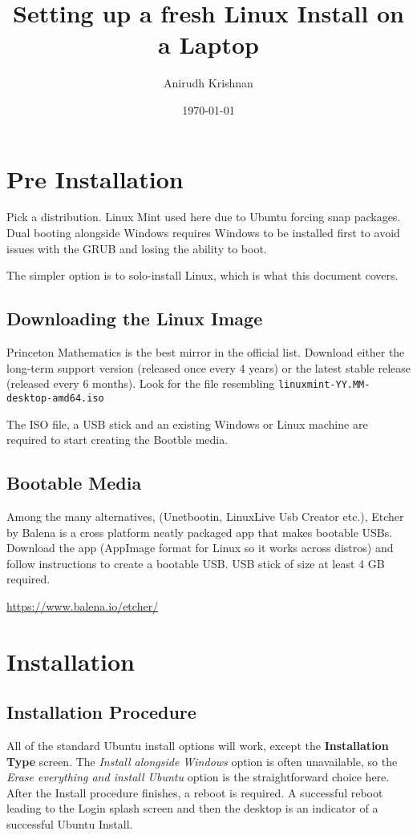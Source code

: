 \documentclass[8pt,letterpaper,twocolumn]{article}
\title{Setting up a fresh Linux Install on a Laptop}
\author{Anirudh Krishnan}
\date{\today}
\begin{document}
\maketitle
\newpage

\tableofcontents
\newpage

\section{Pre Installation}

Pick a distribution. Linux Mint used here due to Ubuntu forcing snap packages.
Dual booting alongside Windows requires Windows to be installed first to avoid
issues with the GRUB and losing the ability to boot.

The simpler option is to solo-install Linux, which is what this document covers.

\subsection{Downloading the Linux Image}

Princeton Mathematics is the best mirror in the official list. Download either the long-term support version
(released once every 4 years) or the latest stable release (released every 6 months).
Look for the file resembling \texttt{linuxmint-YY.MM-desktop-amd64.iso}

The ISO file, a USB stick and an existing Windows or Linux machine are required to start creating the Bootble media.



\subsection{Bootable Media}
Among the many alternatives, (Unetbootin, LinuxLive Usb Creator etc.),
Etcher by Balena is a cross platform neatly packaged app that makes bootable USBs.
Download the app (AppImage format for Linux so it works across distros) and follow instructions to create a bootable USB.
USB stick of size at least 4 GB required.

\url{https://www.balena.io/etcher/}

\newpage

\section{Installation}

\subsection{Installation Procedure}
All of the standard Ubuntu install options will work, except the \textbf{Installation Type} screen.
The \textit{Install alongside Windows} option is often unavailable, so the \textit{Erase everything and install Ubuntu}
option is the straightforward choice here.
After the Install procedure finishes, a reboot is required.
A successful reboot leading to the Login splash screen and then the desktop is an indicator of a successful Ubuntu Install.
\end{document}
